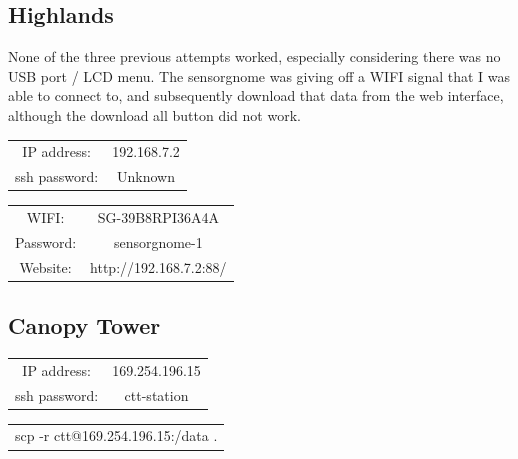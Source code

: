 \documentclass{article}
\begin{document}
\subsection{Highlands}
None of the three previous attempts worked, especially considering there was no USB port / LCD menu. 
The sensorgnome was giving off a WIFI signal that I was able to connect to, and subsequently download that data from the web interface, although the download all button did not work. 
\begin{center}
    \begin{tabular}{c c}
        IP address: & 192.168.7.2 \\
        ssh password: & Unknown
    \end{tabular}
\end{center}
\begin{center}
    \begin{tabular}{c c}
        WIFI: & SG-39B8RPI36A4A \\
        Password: & sensorgnome-1 \\
        Website: & http://192.168.7.2:88/
    \end{tabular}
\end{center}

\subsection{Canopy Tower}
\begin{center}
    \begin{tabular}{c c}
        IP address: & 169.254.196.15 \\
        ssh password: & ctt-station
    \end{tabular}
\end{center}

\begin{center}
    \begin{tabular}{c}
        scp -r ctt@169.254.196.15:/data .
    \end{tabular}
\end{center}

\printbibliography
\end{document}
